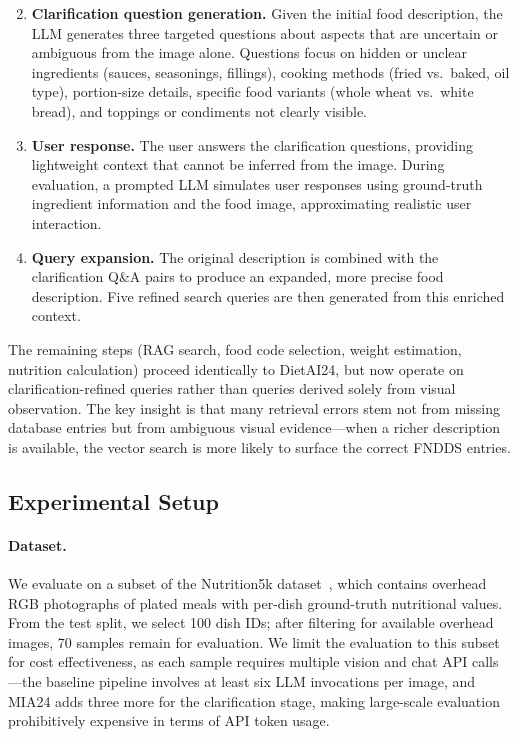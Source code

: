 \documentclass[11pt]{article}
\begin{document}
\begin{enumerate}[nosep]
    \setcounter{enumi}{1}
    \item[\textbf{2a.}] \textbf{Clarification question generation.} Given the initial food description, the LLM generates three targeted questions about aspects that are uncertain or ambiguous from the image alone. Questions focus on hidden or unclear ingredients (sauces, seasonings, fillings), cooking methods (fried vs.\ baked, oil type), portion-size details, specific food variants (whole wheat vs.\ white bread), and toppings or condiments not clearly visible.
    \item[\textbf{2b.}] \textbf{User response.} The user answers the clarification questions, providing lightweight context that cannot be inferred from the image. During evaluation, a prompted LLM simulates user responses using ground-truth ingredient information and the food image, approximating realistic user interaction.
    \item[\textbf{2c.}] \textbf{Query expansion.} The original description is combined with the clarification Q\&A pairs to produce an expanded, more precise food description. Five refined search queries are then generated from this enriched context.
\end{enumerate}

The remaining steps (RAG search, food code selection, weight estimation, nutrition calculation) proceed identically to DietAI24, but now operate on clarification-refined queries rather than queries derived solely from visual observation.
The key insight is that many retrieval errors stem not from missing database entries but from ambiguous visual evidence---when a richer description is available, the vector search is more likely to surface the correct FNDDS entries.

\subsection{Experimental Setup}
\label{sec:setup}

\paragraph{Dataset.}
We evaluate on a subset of the Nutrition5k dataset~\citep{thames2021nutrition5k}, which contains overhead RGB photographs of plated meals with per-dish ground-truth nutritional values.
From the test split, we select 100 dish IDs; after filtering for available overhead images, 70 samples remain for evaluation.
We limit the evaluation to this subset for cost effectiveness, as each sample requires multiple vision and chat API calls---the baseline pipeline involves at least six LLM invocations per image, and MIA24 adds three more for the clarification stage, making large-scale evaluation prohibitively expensive in terms of API token usage.
\end{document}
